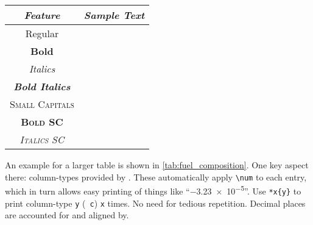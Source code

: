 \begin{table}
	{%
		\begin{tabular}{|c||c|}%
		\hline
			\textit{Feature} & \textit{Sample Text}\\
		\hline
		\hline
			Regular & \sampletext\\
		\hline
			\textbf{Bold} & \textbf{\sampletext}\\
		\hline
			\textit{Italics} & \textit{\sampletext}\\
		\hline
			\textbf{\textit{Bold Italics}} & \textbf{\textit{\sampletext}}\\
		\hline
			\textsc{Small Capitals} & \textsc{\sampletext}\\
		\hline
			\textbf{\textsc{Bold SC}} & \textbf{\textsc{\sampletext}}\\
		\hline
			\textit{\textsc{Italics SC}} & \textit{\textsc{\sampletext}}\\
		\hline
		\end{tabular}
	}%
\end{table}

An example for a larger table is shown in \cref{tab:fuel_composition}.
One key aspect there: column-types provided by .
These automatically apply \verb|\num| to each entry, which in turn allows easy printing of things like \enquote{\num{-3.23e-5}}.
Use \verb|*x{y}| to print column-type \verb|y| (\ \verb|c|) \verb|x| times.
No need for tedious repetition.
Decimal places are accounted for and aligned by.

